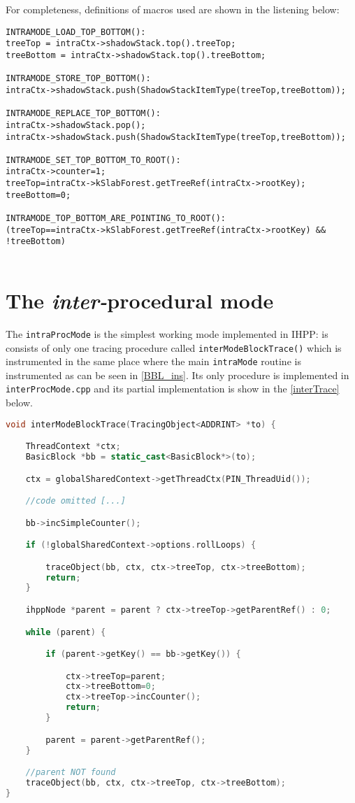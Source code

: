 \documentclass[a4paper,10pt]{report}
\begin{document}
\noindent
For completeness, definitions of macros used are shown in the listening below:

\begin{lstlisting}[caption={partial implementation of \texttt{intraMode\_ret()}},
	label=intraMacros, frame=leftline, showstringspaces=false]
INTRAMODE_LOAD_TOP_BOTTOM():
treeTop = intraCtx->shadowStack.top().treeTop;
treeBottom = intraCtx->shadowStack.top().treeBottom;

INTRAMODE_STORE_TOP_BOTTOM():
intraCtx->shadowStack.push(ShadowStackItemType(treeTop,treeBottom));

INTRAMODE_REPLACE_TOP_BOTTOM():
intraCtx->shadowStack.pop();
intraCtx->shadowStack.push(ShadowStackItemType(treeTop,treeBottom));

INTRAMODE_SET_TOP_BOTTOM_TO_ROOT():
intraCtx->counter=1;
treeTop=intraCtx->kSlabForest.getTreeRef(intraCtx->rootKey);
treeBottom=0;

INTRAMODE_TOP_BOTTOM_ARE_POINTING_TO_ROOT():
(treeTop==intraCtx->kSlabForest.getTreeRef(intraCtx->rootKey) && !treeBottom)


\end{lstlisting}

\section{The \emph{inter-}procedural mode}

The \verb|intraProcMode| is the simplest working mode implemented in IHPP:
is consists of only one tracing procedure called \verb|interModeBlockTrace()|
which is instrumented in the same place where the main \verb|intraMode| routine
is instrumented as can be seen in \cref{BBL_ins}. Its only procedure
is implemented in \verb|interProcMode.cpp| and its partial implementation
is show in the \cref{interTrace} below.

\begin{lstlisting}[language=C++,
	caption={partial implementation of \texttt{interModeBlockTrace}},
	label=interTrace, frame=leftline, showstringspaces=false]
void interModeBlockTrace(TracingObject<ADDRINT> *to) {

	ThreadContext *ctx;
	BasicBlock *bb = static_cast<BasicBlock*>(to);

	ctx = globalSharedContext->getThreadCtx(PIN_ThreadUid());

	//code omitted [...]

	bb->incSimpleCounter();

	if (!globalSharedContext->options.rollLoops) {

		traceObject(bb, ctx, ctx->treeTop, ctx->treeBottom);
		return;
	}

	ihppNode *parent = parent ? ctx->treeTop->getParentRef() : 0;

	while (parent) {

		if (parent->getKey() == bb->getKey()) {

			ctx->treeTop=parent;
			ctx->treeBottom=0;
			ctx->treeTop->incCounter();
			return;
		}

		parent = parent->getParentRef();
	}

	//parent NOT found
	traceObject(bb, ctx, ctx->treeTop, ctx->treeBottom);
}
\end{lstlisting}
\end{document}
